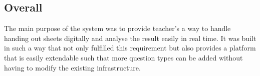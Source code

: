 \subsection{Overall}
The main purpose of the system was to provide teacher's a way to handle handing out sheets digitally and analyse the result easily in real time. It was built in such a way that not only fulfilled this requirement but also provides a platform that is easily extendable such that more question types can be added without having to modify the existing infrastructure.
